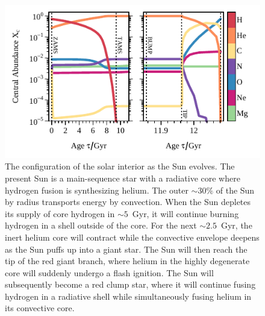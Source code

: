\begin{figure}
    \centering
    \includegraphics[width=\textwidth]{figs/evol/chem_ev_sun_core.pdf}
    \caption[Chemical evolution of the solar core]{The past and future chemical evolution of the core of our Sun. The left panel shows the main sequence evolution, from the zero-age main sequence (ZAMS) to the terminal-age main sequence (TAMS). The right panel shows the evolution from the red giant luminosity bump through to the tip of the red giant branch and eventually to core-helium exhaustion. 
    The core composition does not change throughout the majority of the subgiant and red giant phases. 
    \label{fig:chem_ev}} 
    \vspace*{0.1cm}
    
    \caption[Configurations of the solar interior]{The configuration of the solar interior as the Sun evolves. 
    The present Sun is a main-sequence star with a radiative core where hydrogen fusion is synthesizing helium. 
    The outer ${\sim 30\%}$ of the Sun by radius transports energy by convection. 
    When the Sun depletes its supply of core hydrogen in ${\sim 5}$~Gyr, it will continue burning hydrogen in a shell outside of the core. 
    For the next ${\sim 2.5}$~Gyr, the inert helium core will contract while the convective envelope deepens as the Sun puffs up into a giant star. 
    The Sun will then reach the tip of the red giant branch, where helium in the highly degenerate core will suddenly undergo a flash ignition. 
    The Sun will subsequently become a red clump star, where it will continue fusing hydrogen in a radiative shell while simultaneously fusing helium in its convective core. 
    \label{fig:config}}
\end{figure}

